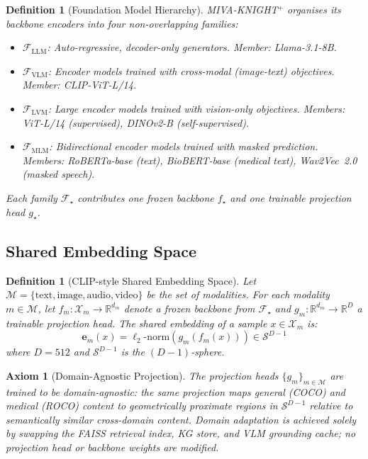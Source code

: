 \documentclass[10pt,conference]{IEEEtran}
\theoremstyle{ieeethm}
\theoremstyle{ieeedef}
\newtheorem{definition}[theorem]{Definition}
\newtheorem{axiom}{Axiom}
\theoremstyle{ieeeremark}
\begin{document}
\begin{definition}[Foundation Model Hierarchy]
\label{def:hierarchy}
\textsc{MIVA-KNIGHT}$^+$ organises its backbone encoders into four non-overlapping families:
\begin{itemize}
  \item $\mathcal{F}_\text{LLM}$: Auto-regressive, decoder-only generators. Member: Llama-3.1-8B.
  \item $\mathcal{F}_\text{VLM}$: Encoder models trained with cross-modal (image-text) objectives. Member: CLIP-ViT-L/14.
  \item $\mathcal{F}_\text{LVM}$: Large encoder models trained with \emph{vision-only} objectives. Members: ViT-L/14 (supervised), DINOv2-B (self-supervised).
  \item $\mathcal{F}_\text{MLM}$: Bidirectional encoder models trained with masked prediction. Members: RoBERTa-base (text), BioBERT-base (medical text), Wav2Vec~2.0 (masked speech).
\end{itemize}
Each family $\mathcal{F}_\star$ contributes one frozen backbone $f_\star$ and one trainable projection head $g_\star$.
\end{definition}

\subsection{Shared Embedding Space}

\begin{definition}[CLIP-style Shared Embedding Space]
\label{def:shared_space}
Let $\mathcal{M} = \{\text{text}, \text{image}, \text{audio}, \text{video}\}$ be the set of modalities. For each modality $m \in \mathcal{M}$, let $f_m : \mathcal{X}_m \rightarrow \mathbb{R}^{d_m}$ denote a frozen backbone from $\mathcal{F}_\star$ and $g_m : \mathbb{R}^{d_m} \rightarrow \mathbb{R}^D$ a trainable projection head. The shared embedding of a sample $x \in \mathcal{X}_m$ is:
\begin{equation}
\mathbf{e}_m(x) = \ell_2\text{-norm}(g_m(f_m(x))) \in \mathcal{S}^{D-1}
\label{eq:embed}
\end{equation}
where $D = 512$ and $\mathcal{S}^{D-1}$ is the $(D{-}1)$-sphere.
\end{definition}

\begin{axiom}[Domain-Agnostic Projection]
\label{ax:domain_agnostic}
The projection heads $\{g_m\}_{m \in \mathcal{M}}$ are trained to be domain-agnostic: the same projection maps general (COCO) and medical (ROCO) content to geometrically proximate regions in $\mathcal{S}^{D-1}$ relative to semantically similar cross-domain content. Domain adaptation is achieved solely by swapping the FAISS retrieval index, KG store, and VLM grounding cache; no projection head or backbone weights are modified.
\end{axiom}
\end{document}
